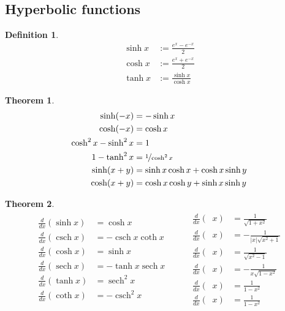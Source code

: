 \documentclass{article}
\DeclareMathOperator{\csch}{csch}
\DeclareMathOperator{\arccosh}{\text{cosh}^{-1}}
\DeclareMathOperator{\arcsinh}{\text{sinh}^{-1}}
\DeclareMathOperator{\arctanh}{\text{tanh}^{-1}}
\DeclareMathOperator{\arcsech}{\text{sech}^{-1}}
\DeclareMathOperator{\arccsch}{\text{csch}^{-1}}
\DeclareMathOperator{\arccoth}{\text{coth}^{-1}}
\DeclareMathOperator{\sech}{sech}
\theoremstyle{sltheorem}
\newtheorem{definition}{Definition}[section]
\newtheorem{theorem}{Theorem}[section]
\begin{document}
\subsection{Hyperbolic functions}
\begin{definition}
    \begin{align*}
        \sinh x &:= \frac{e^x-e^{-x}}{2}\\
        \cosh x &:= \frac{e^x+e^{-x}}{2}\\
        \tanh x &:= \frac{\sinh x}{\cosh x}
    \end{align*}
\end{definition}
\begin{theorem}
    \begin{align*}
        \sinh(-x) &= -\sinh x\\
        \cosh(-x) &= \cosh x\\
        \cosh^2x - \sinh^2x &= 1\\
        1-\tanh^2 x &= \nicefrac{1}{\cosh^2x}\\
        \sinh(x+y) &=\sinh x \cosh x + \cosh x \sinh y\\
        \cosh(x+y) &= \cosh x \cosh y + \sinh x \sinh y 
    \end{align*}
\end{theorem}
\begin{theorem}
    \begin{align*}
        \begin{aligned}
            \frac{d}{dx}(\sinh x)&=\cosh x\\
            \frac{d}{dx}(\csch x)&=-\csch x \coth x\\
            \frac{d}{dx}(\cosh x)&=\sinh x\\
            \frac{d}{dx}(\sech x)&= -\tanh x \sech x\\
            \frac{d}{dx}(\tanh x)&=\sech^2 x\\
            \frac{d}{dx}(\coth x)&= -\csch^2 x
        \end{aligned}
        \hspace{1cm}
        \begin{aligned}
            \frac{d}{dx}(\arcsinh x)&=\frac{1}{\sqrt{1+x^2}}\\
            \frac{d}{dx}(\arccsch x)&=-\frac{1}{|x|\sqrt{x^2+1}}\\
            \frac{d}{dx}(\arccosh x)&=\frac{1}{\sqrt{x^2-1}}\\
            \frac{d}{dx}(\arcsech x)&= -\frac{1}{x\sqrt{1-x^2}}\\
            \frac{d}{dx}(\arctanh x)&=\frac{1}{1-x^2}\\
            \frac{d}{dx}(\arccoth x)&= \frac{1}{1-x^2}
        \end{aligned}
    \end{align*}
\end{theorem}
\end{document}

